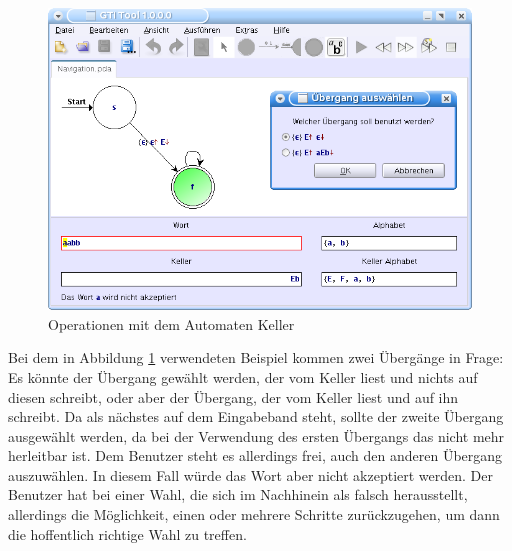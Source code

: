 \begin{figure}[h!]
\begin{center}
\includegraphics[width=12cm]{../images/grammar_pda.png}
\caption{Operationen mit dem Automaten Keller}
\label{FigureGrammarPDA}
\end{center}
\end{figure}
\vspace{10pt}

Bei dem in Abbildung \ref{FigureGrammarPDA} verwendeten Beispiel kommen zwei
Übergänge in Frage: Es könnte der Übergang gewählt werden, der  vom
Keller liest und nichts auf diesen schreibt, oder aber der Übergang, der
 vom Keller liest und  auf ihn schreibt.
Da  als nächstes auf dem Eingabeband steht, sollte der zweite Übergang
ausgewählt werden, da bei der Verwendung des ersten Übergangs das 
nicht mehr herleitbar ist. Dem Benutzer steht es allerdings frei, auch den
anderen Übergang auszuwählen. In diesem Fall würde das Wort
 aber nicht akzeptiert werden. Der
Benutzer hat bei einer Wahl, die sich im Nachhinein als falsch herausstellt,
allerdings die Möglichkeit, einen oder mehrere Schritte zurückzugehen, um dann
die hoffentlich richtige Wahl zu treffen.\vspace{10pt}


